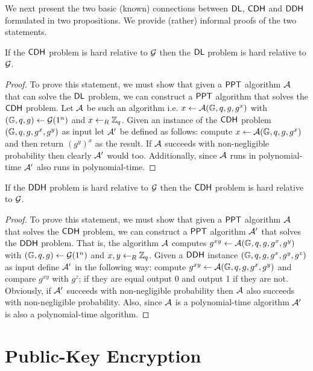 We next present the two basic (known) connections between $\mathsf{DL}$, $\mathsf{CDH}$ and $\mathsf{DDH}$ formulated in two propositions. We provide (rather) informal proofs of the two statements. 

\begin{prop}
If the $\mathsf{CDH}$ problem is hard relative to $\operatorname{\mathcal{G}}$ then the $\mathsf{DL}$ problem is hard relative to $\operatorname{\mathcal{G}}$. 
\end{prop}

\begin{proof}
To prove this statement, we must show that given a $\mathsf{PPT}$ algorithm $\mathcal{A}$ that can solve the $\mathsf{DL}$ problem, we can construct a $\mathsf{PPT}$ algorithm that solves the $\mathsf{CDH}$ problem. Let $\mathcal{A}$ be such an algorithm i.e. $x\leftarrow\mathcal{A}(\mathbb{G},q,g,g^x)$ with $(\mathbb{G},q,g)\leftarrow\operatorname{\mathcal{G}}(1^n)$ and $x\leftarrow_R\mathbb{Z}_q$. Given an instance of the $\mathsf{CDH}$ problem $(\mathbb{G},q,g,g^x,g^y)$ as input let $\mathcal{A}'$ be defined as follows: compute $x\leftarrow\mathcal{A}(\mathbb{G},q,g,g^x)$ and then return $(g^y)^x$ as the result. If $\mathcal{A}$ succeeds with non-negligible probability then clearly $\mathcal{A}'$ would too. Additionally, since $\mathcal{A}$ runs in polynomial-time $\mathcal{A}'$ also runs in polynomial-time.
\end{proof}

\begin{prop}
If the $\mathsf{DDH}$ problem is hard relative to $\operatorname{\mathcal{G}}$ then the $\mathsf{CDH}$ problem is hard relative to $\operatorname{\mathcal{G}}$. 
\end{prop}

\begin{proof}
To prove this statement, we must show that given a $\mathsf{PPT}$ algorithm $\mathcal{A}$ that solves the $\mathsf{CDH}$ problem, we can construct a $\mathsf{PPT}$ algorithm $\mathcal{A}'$ that solves the $\mathsf{DDH}$ problem. That is, the algorithm $\mathcal{A}$ computes $g^{xy}\leftarrow \mathcal{A}(\mathbb{G},q,g,g^x,g^y)$ with $(\mathbb{G},q,g)\leftarrow\operatorname{\mathcal{G}}(1^n)$ and $x,y\leftarrow_R\mathbb{Z}_q$. Given a $\mathsf{DDH}$ instance $(\mathbb{G},q,g,g^x,g^y,g^z)$ as input define $\mathcal{A}'$ in the following way: compute $g^{xy}\leftarrow \mathcal{A}(\mathbb{G},q,g,g^x,g^y)$ and compare $g^{xy}$ with $g^z$; if they are equal output 0 and output 1 if they are not. Obviously, if $\mathcal{A}'$ succeeds with non-negligible probability then $\mathcal{A}$ also succeeds with non-negligible probability. Also, since $\mathcal{A}$ is a polynomial-time algorithm $\mathcal{A}'$ is also a polynomial-time algorithm. 
\end{proof}


\section{Public-Key Encryption}

